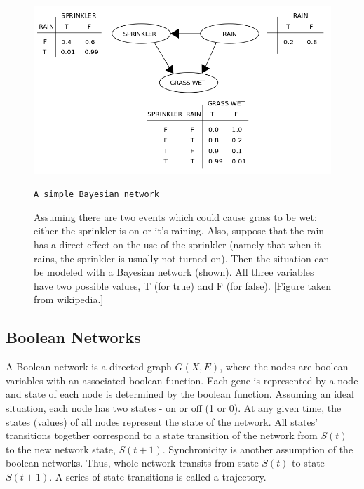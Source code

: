 \documentclass[oneside, a4paper, 11pt]{book}
\begin{document}
\begin{figure}[h]
    \centering
    \includegraphics[width=\textwidth]{bn.png}
    \caption {\texttt{A simple Bayesian network}}
    \captionsetup{singlelinecheck=off,font=footnotesize, width=0.8\textwidth}
    \caption*{Assuming there are two events which could cause grass to be wet: either the sprinkler is on or it's raining. Also, suppose that the rain has a direct effect on the use of the sprinkler (namely that when it rains, the sprinkler is usually not turned on). Then the situation can be modeled with a Bayesian network (shown). All three variables have two possible values, T (for true) and F (for false). [Figure taken from wikipedia.]}
\end{figure}

\subsection{Boolean Networks}
A Boolean network is a directed graph $G(X, E)$, where the nodes are boolean variables with an associated boolean function. Each gene is represented by a node and state of each node is determined by the boolean function. Assuming an ideal situation, each node has two states - on or off (1 or 0). At any given time, the states (values) of all nodes represent the state of the network. All states’ transitions together correspond to a state transition of the network from $S(t)$ to the new network state, $S(t + 1)$. Synchronicity is another assumption of the boolean networks. Thus, whole network transits from state $S(t)$ to state $S(t+1)$. A series of state transitions is called a trajectory\cite{vladmir}.
\end{document}
